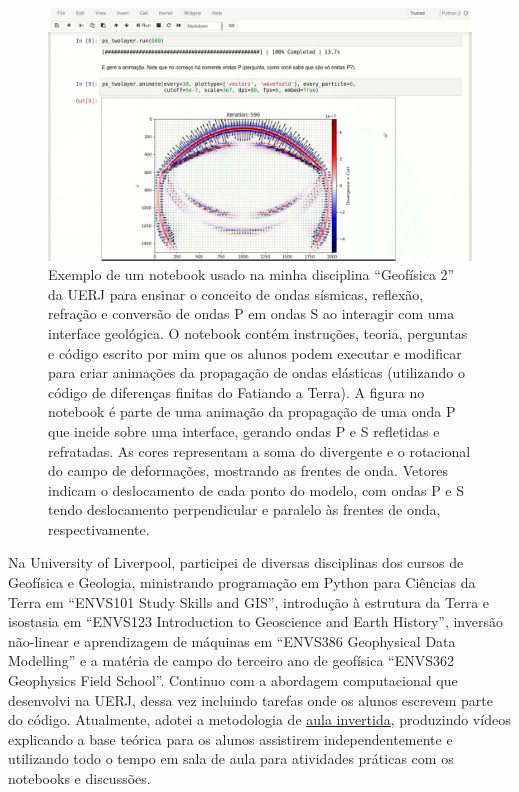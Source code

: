 \documentclass[10pt,a4paper,oneside]{book}
\begin{document}
\begin{figure}[t]
  \begin{center}
    \includegraphics[width=\textwidth]{images/seismic-waves-demo.jpg}
  \end{center}
  \caption{
    Exemplo de um notebook usado na minha disciplina ``Geofísica 2'' da UERJ
    para ensinar o conceito de ondas sísmicas, reflexão, refração e conversão
    de ondas P em ondas S ao interagir com uma interface geológica. O notebook
    contém instruções, teoria, perguntas e código escrito por mim que os alunos
    podem executar e modificar para criar animações da propagação de ondas
    elásticas (utilizando o código de diferenças finitas do Fatiando a Terra).
    A figura no notebook é parte de uma animação da propagação de uma onda P
    que incide sobre uma interface, gerando ondas P e S refletidas e
    refratadas.
    As cores representam a soma do divergente e o rotacional do campo de
    deformações, mostrando as frentes de onda.
    Vetores indicam o deslocamento de cada ponto do modelo, com ondas P e S
    tendo deslocamento perpendicular e paralelo às frentes de onda,
    respectivamente.
  }
  \label{fig_notebooksismica}
\end{figure}

Na University of Liverpool, participei de diversas disciplinas dos cursos de
Geofísica e Geologia, ministrando
programação em Python para Ciências da Terra em ``ENVS101
Study Skills and GIS'',
introdução à estrutura da Terra e isostasia em ``ENVS123 Introduction to
Geoscience and Earth History'',
inversão não-linear e aprendizagem de máquinas em ``ENVS386 Geophysical Data
Modelling''
e a matéria de campo do terceiro ano de geofísica
``ENVS362 Geophysics Field School''.
Continuo com a abordagem computacional que desenvolvi na UERJ, dessa vez
incluindo tarefas onde os alunos escrevem parte do código.
Atualmente, adotei a metodologia de
\href{https://pt.wikipedia.org/wiki/Aula_invertida}{aula invertida}, produzindo
vídeos explicando a base teórica para os alunos assistirem independentemente e
utilizando todo o tempo em sala de aula para atividades práticas com os
notebooks e discussões.
\end{document}

